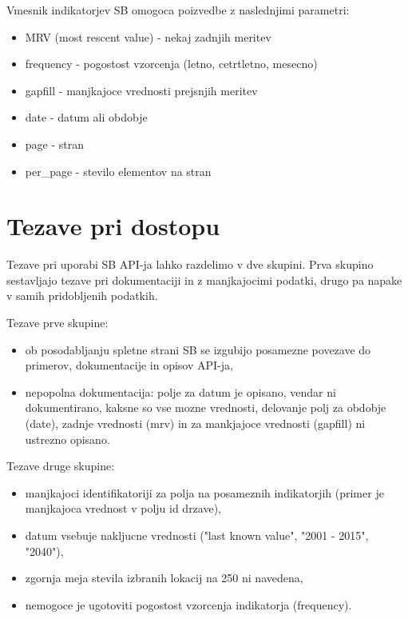 Vmesnik indikatorjev SB omogoca poizvedbe z naslednjimi parametri:

\begin{itemize}  
\item MRV (most rescent value) - nekaj zadnjih meritev
\item frequency - pogostost vzorcenja (letno, cetrtletno, mesecno)
\item gapfill - manjkajoce vrednosti prejsnjih meritev
\item date - datum ali obdobje
\item page - stran
\item per\_page - stevilo elementov na stran
\end{itemize}






\section{Tezave pri dostopu}


Tezave pri uporabi SB API-ja lahko razdelimo v dve skupini. Prva skupino
sestavljajo tezave pri dokumentaciji in z manjkajocimi podatki, drugo pa
napake v samih pridobljenih podatkih.

Tezave prve skupine:

\begin{itemize}  
\item ob posodabljanju spletne strani SB se izgubijo posamezne povezave do 
  primerov, dokumentacije in opisov API-ja,
\item nepopolna dokumentacija:
\subitem polje za datum je opisano, vendar ni dokumentirano, kaksne so vse mozne 
    vrednosti,
\subitem delovanje polj za obdobje (date), zadnje vrednosti (mrv) in za mankjajoce
    vrednosti (gapfill) ni ustrezno opisano.
\end{itemize}  

Tezave druge skupine:


\begin{itemize}  
\item manjkajoci identifikatoriji za polja na posameznih indikatorjih (primer je
  manjkajoca vrednost v polju id drzave),
\item datum vsebuje nakljucne vrednosti ("last known value", "2001 - 2015", "2040"),
\item zgornja meja stevila izbranih lokacij na 250 ni navedena,
\item nemogoce je ugotoviti pogostost vzorcenja indikatorja (frequency).
\end{itemize}  

